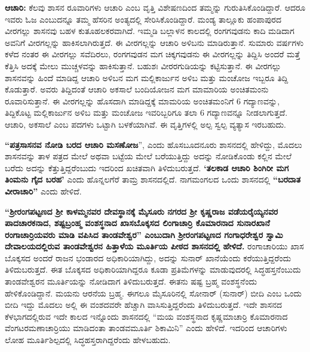 \vskip 3pt

\textbf{ಆಚಾರಿ:} ಕೆಲವು ಶಾಸನ ರೂವಾರಿಗಳು ಆಚಾರಿ ಎಂಬ ವೃತ್ತಿ ವಿಶೇಷಣದಿಂದ ತಮ್ಮನ್ನು ಗುರುತಿಸಿಕೊಂಡಿದ್ದಾರೆ. ಆದರೂ ಇವರು ಓಜ ಎಂಬುದನ್ನೂ ತಮ್ಮ ಹೆಸರಿನ ಅಂತ್ಯದಲ್ಲಿ ಸೇರಿಸಿಕೊಂಡಿದ್ದಾರೆ. ಮಂಡ್ಯ ತಾಲ್ಲೂಕು ಹಂಪಾಪುರದ ವೀರಗಲ್ಲು ಶಾಸನವು ಬಹಳ ಕುತೂಹಲಕರವಾಗಿದೆ. ಇಮ್ಮಡಿ ಬಲ್ಲಾಳನ ಕಾಲದಲ್ಲಿ ರಂಗಗವುಡನು ಕಾದಿ ಮಡಿದಾಗ ಅವನಿಗೆ ವೀರಗಲ್ಲನ್ನು ಹಾಕಿಸಲಾಗಿರುತ್ತದೆ. ಈ ವೀರಗಲ್ಲನ್ನು ಆಚಾರಿ ಅಳಿಬನು ಮಾಡಿರುತ್ತಾನೆ. ಸುಮಾರು ವರ್ಷಗಳು ಕಳೆದ ನಂತರ ಈ ವೀರಗಲ್ಲು ಸವೆದಿರಲು, ರಂಗಗವುಡನ ಮಗ ಚಿಕ್ಕಗವುಡನು ಈ ವೀರಗಲ್ಲನ್ನು ತಿದ್ದಿಸಿ ಅಂದರೆ ಮತ್ತೆ ಕೆತ್ತಿಸಿ ಅದಕ್ಕೆ ಮೇಲು ಮುಚ್ಚಳವನ್ನು ಹಾಕಿಸುತ್ತಾನೆ. ಬಹುಶಃ ವೀರರಗುಡಿಯನ್ನು ಕಟ್ಟಿಸುತ್ತಾನೆ. ಈ ವೀರಗಲ್ಲು ಶಾಸನವನ್ನು ಹಿಂದೆ ಮಾಡಿದ್ದ ಆಚಾರಿ ಅಳಿಬನ ಮಗ ಮಲ್ಲಿಕಾರ್ಜುನ ಅಳಿಬ ಮತ್ತು ಮಂಚೋಜ ಇಬ್ಬರೂ ತಿದ್ದಿ ಕೊಡುತ್ತಾರೆ. ಅವರು ತಿದ್ದಿದಂತೆ ಆಚಾರಿ ಅಕಸಾಲೆ ಬಂದಿಯೋಜನ ಮಗ ಮಾಮಾರಿಯ ಅಂಚಿತಮಂನು ರೂವಾರಿಸುತ್ತಾನೆ. ಈ ವೀರಗಲ್ಲನ್ನು ಹೊಸದಾಗಿ ಮಾಡಿದ್ದಕ್ಕೆ ಮಾಮರಿಯ ಅಂಚಿತಮಂನಿಗೆ 6 ಗದ್ಯಾಣವನ್ನು, ತಿದ್ದಿಕೊಟ್ಟ ಮಲ್ಲಿಕಾರ್ಜುನ ಅಳಿಬ ಮತ್ತು ಮಂಚೋಜ ಇವರಿಬ್ಬರಿಗೂ ತಲಾ 6 ಗದ್ಯಾಣವನ್ನೂ ನೀಡಲಾಗುತ್ತದೆ. ಆಚಾರಿ, ಅಕಸಾಲೆ ಎಂಬ ಪದಗಳು ಒಟ್ಟಾಗಿ ಬಳಕೆಯಾಗಿವೆ. ಈ ವೃತ್ತಿಗಳಲ್ಲಿ ಅಲ್ಪ ಸ್ವಲ್ಪ ವ್ಯತ್ಯಾಸ ಇರಬಹುದು.

\vskip 3pt

\textbf{ “ಪತ್ರಸಾಸನವ ನೋಡಿ ಬರದ ಆಚಾರಿ ಮಸಣೋಜ}”, ಎಂದು ಹೊಸಬೂದನೂರು ಶಾಸನದಲ್ಲಿ ಹೇಳಿದ್ದು, ಮೊದಲು ಶಾಸನವನ್ನು ತಾಳ ಪತ್ರದ ಮೇಲೆ ಅಥವಾ ಬಟ್ಟೆಯ ಮೇಲೆ ಬರೆಯುತ್ತಿದ್ದು ಅದನ್ನು ನೋಡಿಕೊಂಡು ಕಲ್ಲಿನ ಮೇಲೆ ಬರೆದು ಅದನ್ನು ಕೆತ್ತುತ್ತಿದ್ದರೆಂಬುದು ಇದರಿಂದ ಖಚಿತವಾಗಿ ತಿಳಿದುಬರುತ್ತದೆ. \textbf{‘ತಲಕಾಡ ಆಚಾರಿ ಶಿಂಗಿರೀ ಮಗ ತಿಂಮನು ಗೈದ ಬರಹ’} ಎಂದು ಹೊನ್ನಲಗೆರೆ ತಾಮ್ರ ಶಾಸನದಲ್ಲಿದೆ. ನಾಗಮಂಗಲದ ಒಂದು ಶಾಸನದಲ್ಲಿ \textbf{“ಬರದಾತ ವೀರಾಚಾರಿ”} ಎಂದು ಹೇಳಿದೆ.

\vskip 3pt

\textbf{“ಶ‍್ರೀರಂಗಪಟ್ಟಣದ ಶ‍್ರೀ ಕಾಳಮ್ಮನವರ ದೇವಸ್ಥಾನಕ್ಕೆ ಮೈಸೂರು ನಗರದ ಶ‍್ರೀ ಕೃಷ್ಣರಾಜ ವಡೆಯರೈಯ್ಯನವರ ಪಾದಚಾರಕನಾದ, ಶಷ್ಟಬ್ರಂಹ್ಮ ವಂಶಸ್ಥನಾದ ಖಾಸಬೊಕ್ಕಸದ ಲಿಂಗಾಚಾರ್ರಿ ಕೊಮಾರನಾದ ಸುನಾರಖಾನೆ ರಂಗಾಚಾರ್ರಿ\-ಯವರು ಮಾಡಿ ವಪಿಸಿದ ತಾಂಡವೇಶ್ವರ” ಎಂಬುದಾಗಿ ಶ‍್ರೀರಂಗಪಟ್ಟಣದ ಗಂಗಾಧರೇಶ್ವರ ಸ್ವಾಮಿ ದೇವಾಲಯದಲ್ಲಿರುವ ತಾಂಡವೇಶ್ವರನ ಹಿತ್ತಾಳೆಯ ಮೂರ್ತಿಯ ಪೀಠದ ಶಾಸನದಲ್ಲಿ ಹೇಳಿದೆ.} ರಂಗಾಚಾರಿಯು ಖಾಸ ಬೊಕ್ಕಸದ ಅಂದರೆ ರಾಜನ ಭಂಡಾರದ ಅಧಿಕಾರಿಯಾಗಿದ್ದು, ಅದನ್ನು ಸುನಾರ್​ ಖಾನೆಯೆಂದು ಕರೆಯುತ್ತಿದ್ದರೆಂದು ತಿಳಿದುಬರುತ್ತದೆ. ಈತ ಬೊಕ್ಕಸದ ಅಧಿಕಾರಿಯಾಗಿದ್ದರೂ ಕೂಡಾ ಪ್ರತಿಮೆಗಳನ್ನು ಮಾಡುವುದರಲ್ಲಿ ಸಿದ್ಧಹಸ್ತನೆಂಬುದು ತಾಂಡವೇಶ್ವರನ ಮೂರ್ತಿಯನ್ನು ನೋಡಿದಾಗ ತಿಳಿದುಬರುತ್ತದೆ. ಈತನು ಷಷ್ಟ ಬ್ರಹ್ಮ ವಂಶಸ್ಥನೆಂದು ಹೇಳಿಕೊಂಡಿದ್ದಾನೆ. ಮಯನು ಆರನೆಯ ಬ್ರಹ್ಮ. ಈಗಲೂ ಮೈಸೂರಿನಲ್ಲಿ ಸೋನಾರ್​ (ಸುನಾರ್​) ಬೀದಿ ಎಂಬ ಒಂದು ಬೀದಿ ಇದ್ದು ಮೊದಲು ಅಲ್ಲಿ ಈ ವಂಶದವರೇ ಹೆಚ್ಚಾಗಿ ವಾಸಿಸುತ್ತಿದ್ದರೆಂದು ತಿಳಿದುಬರುತ್ತದೆ. ಇದೇ ಶಾಸನದ ಕೆಳಭಾಗದಲ್ಲಿರುವ ಇದೇ ಕಾಲದ ಇನ್ನೊಂದು ಶಾಸನದಲ್ಲಿ “ಮಯ ವಂಶಸ್ಥನಾದ ಕೃಷ್ಣಮಾಚಾರ್ರಿ ಕೊಮಾರನಾದ ವೆಂಗಟರಮಣಾಚಾರ್ರಿಯು ಮಾಡಿದಂತಾ ತಾಂಡವಮೂರ್ತಿ ಶಿಕಾಮಿನಿ” ಎಂದು ಹೇಳಿದೆ. ಇದರಿಂದ ಆಚಾರಿಗಳು ಲೋಹ ಮೂರ್ತಿಶಿಲ್ಪದಲ್ಲಿ ಸಿದ್ಧಹಸ್ತರಾಗಿದ್ದರೆಂದು ಹೇಳಬಹುದು.

